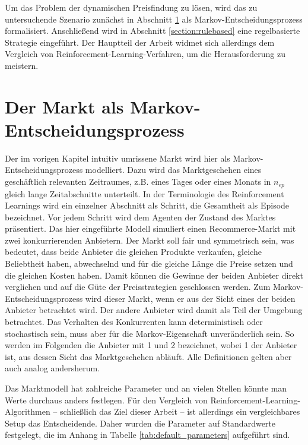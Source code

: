 Um das Problem der dynamischen Preisfindung zu lösen, wird das zu untersuchende Szenario zunächst in Abschnitt \ref{section:markov} als Markov-Entscheidungsprozess formalisiert.
Anschließend wird in Abschnitt \ref{section:rulebased} eine regelbasierte Strategie eingeführt.
Der Hauptteil der Arbeit widmet sich allerdings dem Vergleich von Reinforcement-Learning-Verfahren, um die Herausforderung zu meistern.

\section{Der Markt als Markov-Entscheidungsprozess}
\label{section:markov}
Der im vorigen Kapitel intuitiv umrissene Markt wird hier als Markov-Entscheidungsprozess modelliert.
Dazu wird das Marktgeschehen eines geschäftlich relevanten Zeitraumes, z.B. eines Tages oder eines Monats in $n_{ep}$ gleich lange Zeitabschnitte unterteilt.
In der Terminologie des Reinforcement Learnings wird ein einzelner Abschnitt als Schritt, die Gesamtheit als Episode bezeichnet.
Vor jedem Schritt wird dem Agenten der Zustand des Marktes präsentiert.
Das hier eingeführte Modell simuliert einen Recommerce-Markt mit zwei konkurrierenden Anbietern.
Der Markt soll fair und symmetrisch sein, was bedeutet, dass beide Anbieter die gleichen Produkte verkaufen, gleiche Beliebtheit haben, abwechselnd und für die gleiche Länge die Preise setzen und die gleichen Kosten haben.
Damit können die Gewinne der beiden Anbieter direkt verglichen und auf die Güte der Preisstrategien geschlossen werden.
Zum Markov-Entscheidungsprozess wird dieser Markt, wenn er aus der Sicht eines der beiden Anbieter betrachtet wird.
Der andere Anbieter wird damit als Teil der Umgebung betrachtet.
Das Verhalten des Konkurrenten kann deterministisch oder stochastisch sein, muss aber für die Markov-Eigenschaft unveränderlich sein.
So werden im Folgenden die Anbieter mit 1 und 2 bezeichnet, wobei 1 der Anbieter ist, aus dessen Sicht das Marktgeschehen abläuft.
Alle Definitionen gelten aber auch analog andersherum.

Das Marktmodell hat zahlreiche Parameter und an vielen Stellen könnte man Werte durchaus anders festlegen.
Für den Vergleich von Reinforcement-Learning-Algorithmen -- schließlich das Ziel dieser Arbeit -- ist allerdings ein vergleichbares Setup das Entscheidende.
Daher wurden die Parameter auf Standardwerte festgelegt, die im Anhang in Tabelle \ref{tab:default_parameters} aufgeführt sind.

